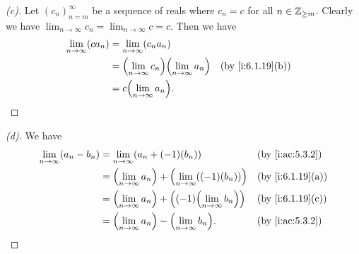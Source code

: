 \begin{proof}[(c)]
  Let \((c_n)_{n = m}^\infty\) be a sequence of reals where \(c_n = c\) for all \(n \in \mathbb{Z}_{\geq m}\).
  Clearly we have \(\lim_{n \to \infty} c_n = \lim_{n \to \infty} c = c\).
  Then we have
  \begin{align*}
    \lim_{n \to \infty} (c a_n) & = \lim_{n \to \infty} (c_n a_n)                                                   \\
                                & = \pa{\lim_{n \to \infty} c_n} \pa{\lim_{n \to \infty} a_n} &  & \by{i:6.1.19}[b] \\
                                & = c \pa{\lim_{n \to \infty} a_n}.
  \end{align*}
\end{proof}

\begin{proof}[(d)]
  We have
  \begin{align*}
    \lim_{n \to \infty} (a_n - b_n) & = \lim_{n \to \infty} (a_n + (-1)(b_n))                                &  & \by{i:ac:5.3.2}  \\
                                    & = \pa{\lim_{n \to \infty} a_n} + \pa{\lim_{n \to \infty} ((-1)(b_n))}  &  & \by{i:6.1.19}[a] \\
                                    & = \pa{\lim_{n \to \infty} a_n} + \pa{(-1)\pa{\lim_{n \to \infty} b_n}} &  & \by{i:6.1.19}[c] \\
                                    & = \pa{\lim_{n \to \infty} a_n} - \pa{\lim_{n \to \infty} b_n}.         &  & \by{i:ac:5.3.2}
  \end{align*}
\end{proof}

